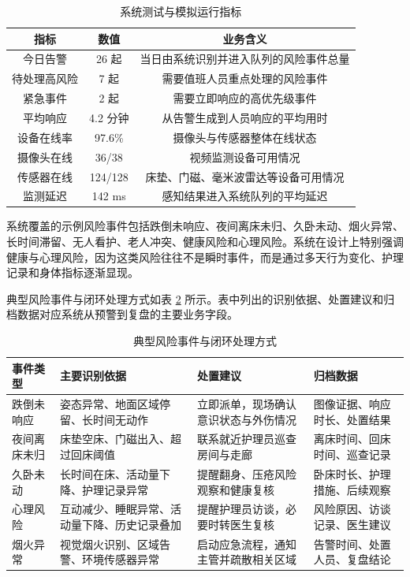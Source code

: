 \documentclass[UTF8,a4paper,zihao=-4,fontset=fandol]{ctexart}
\begin{document}
\begin{table}[H]
  \centering
  \caption{系统测试与模拟运行指标}
  \label{tab:runtime-data}
  \begin{tabular}{ccc}
    \toprule
    指标 & 数值 & 业务含义 \\
    \midrule
    今日告警 & 26 起 & 当日由系统识别并进入队列的风险事件总量 \\
    待处理高风险 & 7 起 & 需要值班人员重点处理的风险事件 \\
    紧急事件 & 2 起 & 需要立即响应的高优先级事件 \\
    平均响应 & 4.2 分钟 & 从告警生成到人员响应的平均用时 \\
    设备在线率 & 97.6\% & 摄像头与传感器整体在线状态 \\
    摄像头在线 & 36/38 & 视频监测设备可用情况 \\
    传感器在线 & 124/128 & 床垫、门磁、毫米波雷达等设备可用情况 \\
    监测延迟 & 142 ms & 感知结果进入系统队列的平均延迟 \\
    \bottomrule
  \end{tabular}
\end{table}

系统覆盖的示例风险事件包括跌倒未响应、夜间离床未归、久卧未动、烟火异常、长时间滞留、无人看护、老人冲突、健康风险和心理风险。系统在设计上特别强调健康与心理风险，因为这类风险往往不是瞬时事件，而是通过多天行为变化、护理记录和身体指标逐渐显现。

典型风险事件与闭环处理方式如表 \ref{tab:event-closed-loop} 所示。表中列出的识别依据、处置建议和归档数据对应系统从预警到复盘的主要业务字段。

\begin{table}[H]
  \centering
  \caption{典型风险事件与闭环处理方式}
  \label{tab:event-closed-loop}
  \begin{tabularx}{\textwidth}{>{\centering\arraybackslash}p{3.0cm}>{\centering\arraybackslash}p{3.5cm}>{\centering\arraybackslash}X>{\centering\arraybackslash}p{3.1cm}}
    \toprule
    事件类型 & 主要识别依据 & 处置建议 & 归档数据 \\
    \midrule
    跌倒未响应 & 姿态异常、地面区域停留、长时间无动作 & 立即派单，现场确认意识状态与外伤情况 & 图像证据、响应时长、处置结果 \\
    夜间离床未归 & 床垫空床、门磁出入、超过回床阈值 & 联系就近护理员巡查房间与走廊 & 离床时间、回床时间、巡查记录 \\
    久卧未动 & 长时间在床、活动量下降、护理记录异常 & 提醒翻身、压疮风险观察和健康复核 & 卧床时长、护理措施、后续观察 \\
    心理风险 & 互动减少、睡眠异常、活动量下降、历史记录叠加 & 提醒护理员访谈，必要时转医生复核 & 风险原因、访谈记录、医生建议 \\
    烟火异常 & 视觉烟火识别、区域告警、环境传感器异常 & 启动应急流程，通知主管并疏散相关区域 & 告警时间、处置人员、复盘结论 \\
    \bottomrule
  \end{tabularx}
\end{table}
\end{document}
